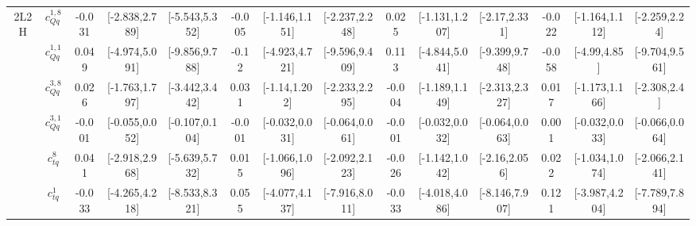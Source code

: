 \documentclass{article}
\begin{document}
\begin{table}[H]
\begin{tabular}{|c|c|c|c|c|c|c|c|c|c|c|c|c|c|}
\hline
\multirow{14}{*}{2L2H}
 & $c_{Qq}^{1,8}$ & -0.031                             & [-2.838,2.789]                                 & [-5.543,5.352] & -0.005                             & [-1.146,1.151]                                 & [-2.237,2.248] & 0.025                             & [-1.131,1.207]                                 & [-2.17,2.331] & -0.022                             & [-1.164,1.112]                                 & [-2.259,2.24] \\ \cline{2-14}
 & $c_{Qq}^{1,1}$ & 0.049                             & [-4.974,5.091]                                 & [-9.856,9.788] & -0.12                             & [-4.923,4.721]                                 & [-9.596,9.409] & 0.113                             & [-4.844,5.041]                                 & [-9.399,9.748] & -0.058                             & [-4.99,4.85]                                 & [-9.704,9.561] \\ \cline{2-14}
 & $c_{Qq}^{3,8}$ & 0.026                             & [-1.763,1.797]                                 & [-3.442,3.442] & 0.031                             & [-1.14,1.202]                                 & [-2.233,2.295] & -0.004                             & [-1.189,1.149]                                 & [-2.313,2.327] & 0.017                             & [-1.173,1.166]                                 & [-2.308,2.4] \\ \cline{2-14}
 & $c_{Qq}^{3,1}$ & -0.001                             & [-0.055,0.052]                                 & [-0.107,0.104] & -0.001                             & [-0.032,0.031]                                 & [-0.064,0.061] & -0.001                             & [-0.032,0.032]                                 & [-0.064,0.063] & 0.001                             & [-0.032,0.033]                                 & [-0.066,0.064] \\ \cline{2-14}
 & $c_{tq}^{8}$ & 0.041                             & [-2.918,2.968]                                 & [-5.639,5.732] & 0.015                             & [-1.066,1.096]                                 & [-2.092,2.123] & -0.026                             & [-1.142,1.042]                                 & [-2.16,2.056] & 0.022                             & [-1.034,1.074]                                 & [-2.066,2.141] \\ \cline{2-14}
 & $c_{tq}^{1}$ & -0.033                             & [-4.265,4.218]                                 & [-8.533,8.321] & 0.055                             & [-4.077,4.137]                                 & [-7.916,8.011] & -0.033                             & [-4.018,4.086]                                 & [-8.146,7.907] & 0.121                             & [-3.987,4.204]                                 & [-7.789,7.894] \\ \cline{2-14}

\end{tabular}
\end{table}
\end{document}
